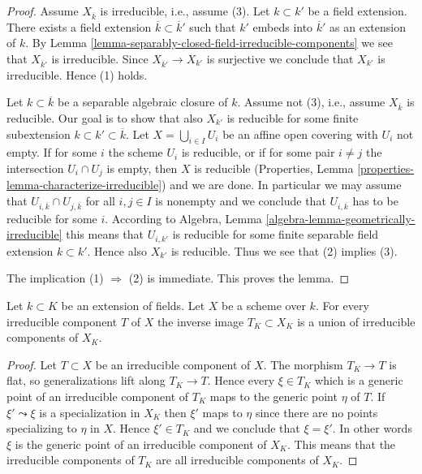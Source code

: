\begin{proof}
Assume $X_{\overline{k}}$ is irreducible, i.e., assume (3).
Let $k \subset k'$ be a field extension.
There exists a field extension $\overline{k} \subset \overline{k}'$
such that $k'$ embeds into $\overline{k}'$ as an extension of $k$.
By Lemma \ref{lemma-separably-closed-field-irreducible-components}
we see that $X_{\overline{k}'}$ is irreducible.
Since $X_{\overline{k}'} \to X_{k'}$ is surjective we conclude
that $X_{k'}$ is irreducible. Hence (1) holds.

\medskip\noindent
Let $k \subset \overline{k}$ be a separable algebraic closure of $k$.
Assume not (3), i.e., assume $X_{\overline{k}}$ is reducible.
Our goal is to show that also $X_{k'}$ is
reducible for some finite subextension
$k \subset k' \subset \overline{k}$.
Let $X = \bigcup_{i \in I} U_i$ be an affine open covering
with $U_i$ not empty. If for some $i$ the scheme
$U_i$ is reducible, or if for some pair $i \not = j$ the
intersection $U_i \cap U_j$ is empty, then $X$ is reducible
(Properties, Lemma \ref{properties-lemma-characterize-irreducible})
and we are done.
In particular we may assume that
$U_{i, \overline{k}} \cap U_{j, \overline{k}}$ for all $i, j \in I$
is nonempty and we conclude that $U_{i, \overline{k}}$ has
to be reducible for some $i$. According to
Algebra, Lemma \ref{algebra-lemma-geometrically-irreducible}
this means that $U_{i, k'}$ is reducible for some
finite separable field extension $k \subset k'$.
Hence also $X_{k'}$ is reducible. Thus we see that
(2) implies (3).

\medskip\noindent
The implication (1) $\Rightarrow$ (2) is immediate.
This proves the lemma.
\end{proof}

\begin{lemma}
\label{lemma-inverse-image-irreducible}
Let $k \subset K$ be an extension of fields.
Let $X$ be a scheme over $k$.
For every irreducible component $T$ of $X$ the inverse image
$T_K \subset X_K$ is a union of irreducible components of $X_K$.
\end{lemma}

\begin{proof}
Let $T \subset X$ be an irreducible component of $X$.
The morphism $T_K \to T$ is flat, so generalizations lift
along $T_K \to T$. Hence every $\xi \in T_K$
which is a generic point of an irreducible component of $T_K$
maps to the generic point $\eta$ of $T$. If $\xi' \leadsto \xi$ is
a specialization in $X_K$ then $\xi'$ maps to $\eta$ since there
are no points specializing to $\eta$ in $X$. Hence $\xi' \in T_K$
and we conclude that $\xi = \xi'$. In other words $\xi$ is the
generic point of an irreducible component of $X_K$. This
means that the irreducible components of $T_K$ are all irreducible
components of $X_K$.
\end{proof}

